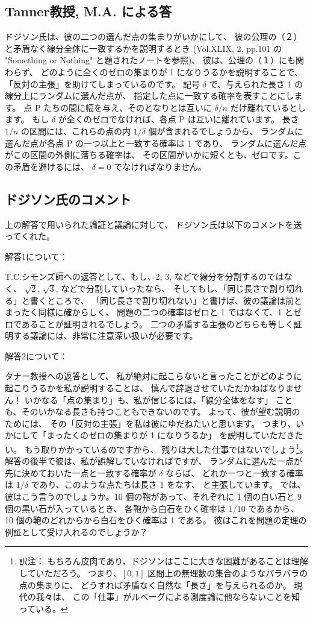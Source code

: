 \documentclass{article}
\begin{document}
\subsection*{Tanner教授, M.A. による答}

 ドジソン氏は、彼の二つの選んだ点の集まりがいかにして、
彼の公理の（２）と矛盾なく線分全体に一致するかを説明するとき
(Vol.XLIX, 2, pp.101 の "Something or Nothing" と題されたノートを参照)、
彼は、公理の（１）にも関わらず、
どのように全くのゼロの集まりが 1 になりうるかを説明することで、
「反対の主張」を助けてしまっているのです。
 記号 $\delta$ で、与えられた長さ 1 の線分上にランダムに選んだ点が、
指定した点に一致する確率を表すことにします。
点 P たちの間に幅を与え、そのとなりとは互いに $\delta / n$
だけ離れているとします。
もし $\delta$ が全くのゼロでなければ、各点 P は互いに離れています。
長さ $1/n$ の区間には、これらの点の内 $1/\delta$ 個が含まれるでしょうから、
ランダムに選んだ点が各点 P の一つ以上と一致する確率は 1 であり、
ランダムに選んだ点がこの区間の外側に落ちる確率は、
その区間がいかに短くとも、ゼロです。この矛盾を避けるには、
$\delta = 0$ でなければなりません。

\subsection*{ドジソン氏のコメント}

上の解答で用いられた論証と議論に対して、
ドジソン氏は以下のコメントを送ってくれた。

解答1について：

T.C.シモンズ師への返答として、もし、2, 3, などで線分を分割するのではなく、
$\sqrt{2}$, $\sqrt{3}$, などで分割していったなら、
そしてもし、「同じ長さで割り切れる」と書くところで、
「同じ長さで割り切れない」と書けば、彼の議論は前とまったく同様に確からしく、
問題の二つの確率はゼロと 1 ではなくて、1 とゼロであることが証明されるでしょう。
二つの矛盾する主張のどちらも等しく証明する議論には、非常に注意深い扱いが必要です。

解答2について：

タナー教授への返答として、
私が絶対に起こらないと言ったことがどのように起こりうるかを私が説明することは、
慎んで辞退させていただかねばなりません！
いかなる「点の集まり」も、私が信じるには、「線分全体をなす」
ことも、そのいかなる長さも持つこともできないのです。
よって、彼が望む説明のためには、
その「反対の主張」を私は彼にゆだねたいと思います。
つまり、いかにして「まったくのゼロの集まりが 1 になりうるか」
を説明していただきたい。
もう取りかかっているのですから、
残りは大した仕事ではないでしょう\footnote{訳注：
もちろん皮肉であり、ドジソンはここに大きな困難があることは理解していただろう。
つまり、$[0, 1]$ 区間上の無理数の集合のようなバラバラの点の集まりに、
どうすれば矛盾なく自然な「長さ」を与えられるのか。
現代の我々は、
この「仕事」がルベーグによる測度論に他ならないことを知っている。}。
解答の後半で彼は、私が誤解していなければですが、
ランダムに選んだ一点が先に決めておいた一点と一致する確率が $\delta$ ならば、
どれか一つと一致する確率は $1/\delta$ であり、このような点たちは長さ 1 をなす、
と主張しています。
では、彼はこう言うのでしょうか。10 個の鞄があって、それぞれに
1 個の白い石と 9 個の黒い石が入っているとき、
各鞄から白石をひく確率は $1/10$ であるから、
10 個の鞄のどれからから白石をひく確率は 1 である。
彼はこれを問題の定理の例証として受け入れるのでしょうか？
\end{document}
